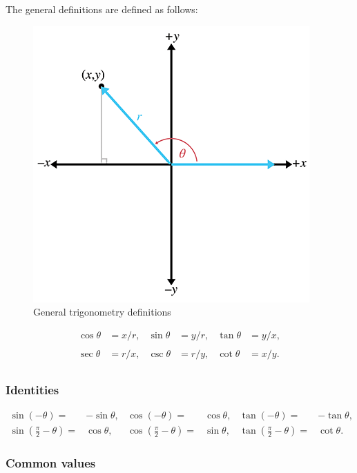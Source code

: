 \documentclass[a4paper,11pt]{article}
\begin{document}
The general definitions are defined as follows:
\begin{figure}[H]
\centering
    \includegraphics{01_general_trigonometry_definitions}
\caption{General trigonometry definitions}
\label{fig:general-trigonometry-definitions}
\end{figure}

\[\begin{matrix}
{\cos\theta} & {= x/r,} & {\sin\theta} & {= y/r,} & {\tan\theta} & {= y/x,} \\
 & & & & & \\
{\sec\theta} & {= r/x,} & {\csc\theta} & {= r/y,} & {\cot\theta} & {= x/y.} \\
\end{matrix}\]

\subsubsection{Identities}

\[
\begin{array}{rlrlrl}
{\sin( - \theta) =} & {- \sin\theta,} & {\cos( - \theta) =} & {\cos\theta,} & {\tan( - \theta) =} & {- \tan\theta,} \\
{\sin\left( \frac{\pi}{2} - \theta \right) =} & {\cos\theta,} & {\cos\left( \frac{\pi}{2} - \theta \right) =} & {\sin\theta,} & {\tan\left( \frac{\pi}{2} - \theta \right) =} & {\cot\theta.}
\end{array}
\]

\subsubsection{Common values}
\end{document}

